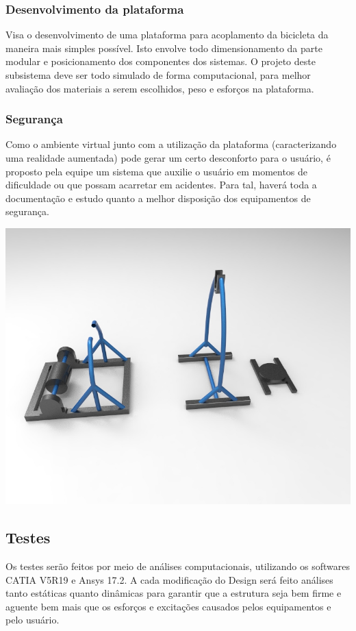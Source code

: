 \subsubsection{Desenvolvimento da plataforma}
Visa o desenvolvimento de uma plataforma para acoplamento da bicicleta da maneira mais simples possível. Isto envolve todo dimensionamento da parte modular e posicionamento dos componentes dos sistemas. O projeto deste subsistema deve ser todo simulado de forma computacional, para melhor avaliação dos materiais a serem escolhidos, peso e esforços na plataforma.

\subsubsection{Segurança}
Como o ambiente virtual junto com a utilização da plataforma (caracterizando uma realidade aumentada) pode gerar um certo desconforto para o usuário, é proposto pela equipe um sistema que auxilie o usuário em momentos de dificuldade ou que possam acarretar em acidentes. Para tal, haverá toda a documentação e estudo quanto a melhor disposição dos equipamentos de segurança.

\begin{center}
	\includegraphics[scale=0.4]{figuras/bike_2}
\end{center} 

\subsection{Testes}
Os testes serão feitos por meio de análises computacionais, utilizando os softwares CATIA V5R19 e Ansys 17.2. A cada modificação do Design será feito análises tanto estáticas quanto dinâmicas para garantir que a estrutura seja bem firme e aguente bem mais que os esforços e excitações causados pelos equipamentos e pelo usuário.

